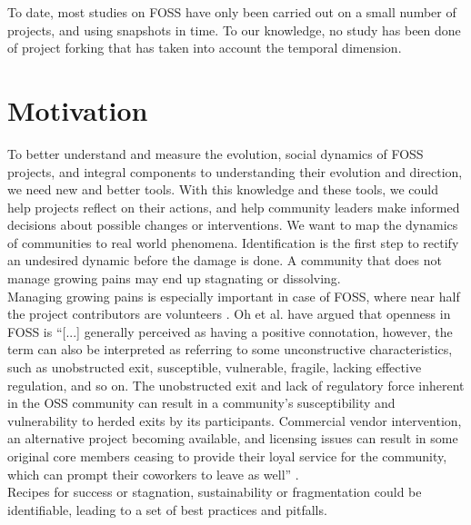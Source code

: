 \documentclass[conference]{IEEEtran}
\begin{document}
To date, most studies on FOSS have only been carried out on a small number of projects, and using snapshots in time. To our knowledge, no study has been done of project forking that has taken into account the temporal dimension.\\

\section{Motivation}
\label{motivation}
To better understand and measure the evolution, social dynamics of FOSS projects, and integral components to understanding their evolution and direction, we need new and better tools. With this knowledge and these tools, we could help projects reflect on their actions, and help community leaders make informed decisions about possible changes or interventions. We want to map the dynamics of communities to real world phenomena. Identification is the first step to rectify an undesired dynamic before the damage is done. A community that does not manage growing pains may end up stagnating or dissolving. \\

Managing growing pains is especially important in case of FOSS, where near half the project contributors are volunteers \cite{Forrest}. Oh et al. \cite{Oh} have argued that openness in FOSS is ``[...] generally perceived as having a positive connotation, however, the term can also be interpreted as referring to some unconstructive characteristics, such as unobstructed exit, susceptible, vulnerable, fragile, lacking effective regulation, and so on. The unobstructed exit and lack of regulatory force inherent in the OSS community can result in a community's susceptibility and vulnerability to herded exits by its participants. Commercial vendor intervention, an alternative project becoming available, and licensing issues can result in some original core members ceasing to provide their loyal service for the community, which can prompt their coworkers to leave as well'' \cite{Oh}.\\

Recipes for success or stagnation, sustainability or fragmentation could be identifiable, leading to a set of best practices and pitfalls. \\
\end{document}

